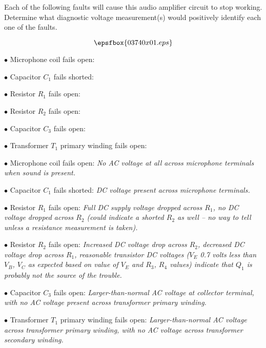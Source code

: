 

Each of the following faults will cause this audio amplifier circuit to stop working.  Determine what diagnostic voltage measurement(s) would positively identify each one of the faults.

$$\epsfbox{03740x01.eps}$$

\medskip
\item{$\bullet$} Microphone coil fails open:
\vskip 5pt
\item{$\bullet$} Capacitor $C_1$ fails shorted:
\vskip 5pt
\item{$\bullet$} Resistor $R_1$ fails open:
\vskip 5pt
\item{$\bullet$} Resistor $R_2$ fails open:
\vskip 5pt
\item{$\bullet$} Capacitor $C_3$ fails open:
\vskip 5pt
\item{$\bullet$} Transformer $T_1$ primary winding fails open:
\medskip







\medskip
\item{$\bullet$} Microphone coil fails open: {\it No AC voltage at all across microphone terminals when sound is present.}
\vskip 5pt
\item{$\bullet$} Capacitor $C_1$ fails shorted: {\it DC voltage present across microphone terminals.}
\vskip 5pt
\item{$\bullet$} Resistor $R_1$ fails open: {\it Full DC supply voltage dropped across $R_1$, no DC voltage dropped across $R_2$ (could indicate a shorted $R_2$ as well -- no way to tell unless a resistance measurement is taken).}
\vskip 5pt
\item{$\bullet$} Resistor $R_2$ fails open: {\it Increased DC voltage drop across $R_2$, decreased DC voltage drop across $R_1$, reasonable transistor DC voltages ($V_E$ 0.7 volts less than $V_B$, $V_C$ as expected based on value of $V_E$ and $R_3$, $R_4$ values) indicate that $Q_1$ is probably not the source of the trouble.}
\vskip 5pt
\item{$\bullet$} Capacitor $C_3$ fails open: {\it Larger-than-normal AC voltage at collector terminal, with no AC voltage present across transformer primary winding.}
\vskip 5pt
\item{$\bullet$} Transformer $T_1$ primary winding fails open: {\it Larger-than-normal AC voltage across transformer primary winding, with no AC voltage across transformer secondary winding.}
\medskip

